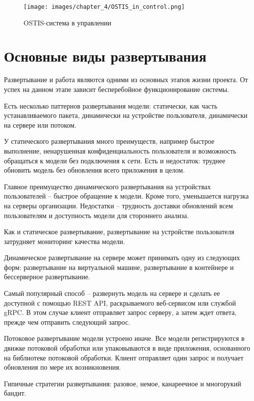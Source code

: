 \begin{figure}[H]
    \centering
    \texttt{[image: images/chapter\_4/OSTIS\_in\_control.png]}
    \caption{OSTIS-система в управлении}
    \label{fig:OSTIS_in_control}
\end{figure}

\section{Основные виды развертывания}

Развертывание и работа являются одними из основных этапов жизни проекта. От успех на данном этапе зависит бесперебойное функционирование системы.

Есть несколько паттернов развертывания модели: статически, как часть устанавливаемого пакета, динамически на устройстве пользователя, динамически на сервере или потоком.

У статического развертывания много преимуществ, например быстрое выполнение, ненарушенная конфиденциальность пользователя и возможность обращаться к модели без подключения к сети. Есть и недостаток: труднее обновить модель без обновления всего приложения в целом.

Главное преимущество динамического развертывания на устройствах пользователей {--} быстрое обращение к модели. Кроме того, уменьшается нагрузка на серверы организации. Недостатки – трудность доставки обновлений всем пользователям и доступность модели для стороннего анализа.

Как и статическое развертывание, развертывание на устройстве пользователя затрудняет мониторинг качества модели.

Динамическое развертывание на сервере может принимать одну из следующих форм: развертывание на виртуальной машине, развертывание в контейнере и бессерверное развертывание.

Самый популярный способ {--} развернуть модель на сервере и сделать ее доступной с помощью REST API, раскрываемого веб-сервисом или службой gRPC. В этом случае клиент отправляет запрос серверу, а затем ждет ответа, прежде чем отправить следующий запрос.

Потоковое развертывание модели устроено иначе. Все модели регистрируются в движке потоковой обработки или упаковываются в виде приложения, основанного на библиотеке потоковой обработки. Клиент отправляет один запрос и получает обновления по мере их возникновения.

Гипичные стратегии развертывания: разовое, немое, канареечное и многорукий бандит.

